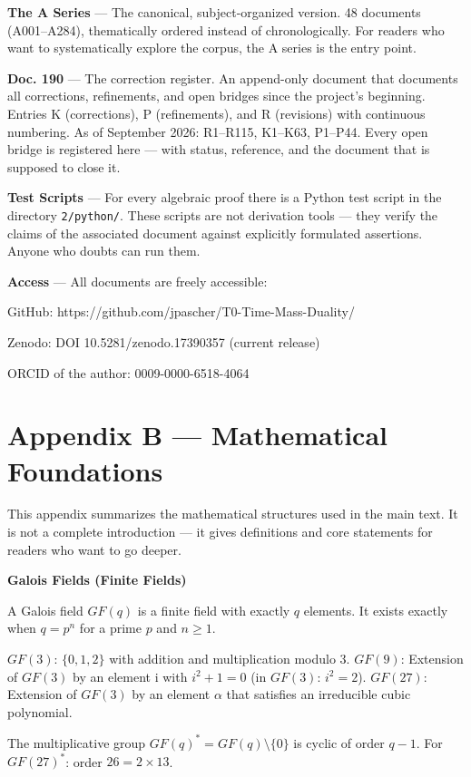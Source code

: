 \documentclass[11pt,oneside]{book}
\begin{document}
\textbf{The A Series} — The canonical, subject-organized version. 48 documents
(A001–A284), thematically ordered instead of chronologically. For readers
who want to systematically explore the corpus, the A series is the entry
point.

\textbf{Doc. 190} — The correction register. An append-only document that
documents all corrections, refinements, and open bridges since the project's
beginning. Entries K (corrections), P (refinements), and R (revisions) with
continuous numbering. As of September 2026: R1–R115, K1–K63, P1–P44. Every
open bridge is registered here — with status, reference, and the document
that is supposed to close it.

\textbf{Test Scripts} — For every algebraic proof there is a Python test script
in the directory \texttt{2/python/}. These scripts are not derivation tools —
they verify the claims of the associated document against explicitly
formulated assertions. Anyone who doubts can run them.

\textbf{Access} — All documents are freely accessible:

GitHub: https://github.com/jpascher/T0-Time-Mass-Duality/

Zenodo: DOI 10.5281/zenodo.17390357 (current release)

ORCID of the author: 0009-0000-6518-4064


\chapter*{Appendix B — Mathematical Foundations}

This appendix summarizes the mathematical structures used in the main text.
It is not a complete introduction — it gives definitions and core statements
for readers who want to go deeper.

\textbf{Galois Fields (Finite Fields)}

A Galois field $GF(q)$ is a finite field with exactly $q$ elements. It exists
exactly when $q = p^n$ for a prime $p$ and $n \geq 1$.

$GF(3)$: $\{0, 1, 2\}$ with addition and multiplication modulo 3.
$GF(9)$: Extension of $GF(3)$ by an element i with $i^2 + 1 = 0$ (in
$GF(3)$: $i^2 = 2$).
$GF(27)$: Extension of $GF(3)$ by an element $\alpha$ that satisfies an
irreducible cubic polynomial.

The multiplicative group $GF(q)^* = GF(q)\setminus\{0\}$ is cyclic of order $q-1$.
For $GF(27)^*$: order $26 = 2\times 13$.
\end{document}
